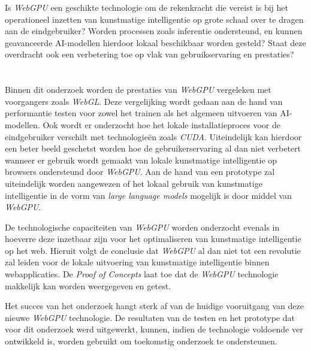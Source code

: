Is \textit{WebGPU} een geschikte technologie om de rekenkracht die vereist is bij het operationeel inzetten van kunstmatige intelligentie op grote schaal over te dragen aan de eindgebruiker? Worden processen zoals inferentie ondersteund, en kunnen geavanceerde AI-modellen hierdoor lokaal beschikbaar worden gesteld? Staat deze overdracht ook een verbetering toe op vlak van gebruikservaring en prestaties?

\section{}%
\label{sec:onderzoeksdoelstelling}


Binnen dit onderzoek worden de prestaties van \textit{WebGPU} vergeleken met voorgangers zoals \textit{WebGL}. Deze vergelijking wordt gedaan aan de hand van performantie testen voor zowel het trainen als het algemeen uitvoeren van AI-modellen. Ook wordt er onderzocht hoe het lokale installatieproces voor de eindgebruiker verschilt met technologieën zoals \textit{CUDA}. Uiteindelijk kan hierdoor een beter beeld geschetst worden hoe de gebruikerservaring al dan niet verbetert wanneer er gebruik wordt gemaakt van lokale kunstmatige intelligentie op browsers ondersteund door \textit{WebGPU}. Aan de hand van een prototype zal uiteindelijk worden aangewezen of het lokaal gebruik van kunstmatige intelligentie in de vorm van \textit{large language models} mogelijk is door middel van \textit{WebGPU}.

\bigbreak{}

De technologische capaciteiten van \textit{WebGPU} worden onderzocht evenals in hoeverre deze inzetbaar zijn voor het optimaliseren van kunstmatige intelligentie op het web. Hieruit volgt de conclusie dat \textit{WebGPU} al dan niet tot een revolutie zal leiden voor de lokale uitvoering van kunstmatige intelligentie binnen web\-app\-li\-ca\-ties. De \textit{Proof of Concepts} laat toe dat de \textit{WebGPU} technologie makkelijk kan worden weergegeven en getest.

\bigbreak{}

Het succes van het onderzoek hangt sterk af van de huidige vooruitgang van deze nieuwe \textit{WebGPU} technologie. De resultaten van de testen en het prototype dat voor dit onderzoek werd uitgewerkt, kunnen, indien de technologie voldoende ver ontwikkeld is, worden gebruikt om toekomstig onderzoek te ondersteunen.

